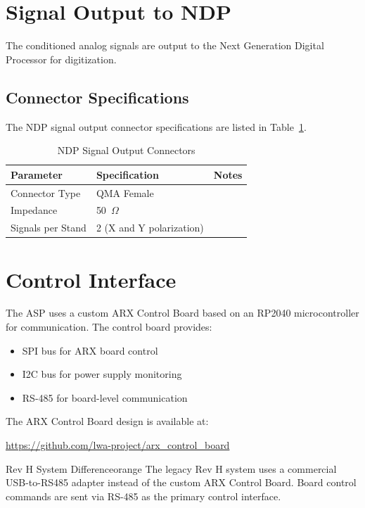 \section{Signal Output to NDP}

The conditioned analog signals are output to the Next Generation Digital Processor for digitization.

\subsection{Connector Specifications}

The NDP signal output connector specifications are listed in Table~\ref{tab:ndp-connectors}.

\begin{table}[htbp]
    \centering
    \caption{NDP Signal Output Connectors}
    \label{tab:ndp-connectors}
    \begin{tabular}{lll}
        \toprule
        \textbf{Parameter} & \textbf{Specification} & \textbf{Notes} \\
        \midrule
        Connector Type & QMA Female & \\
        Impedance & 50~$\Omega$ & \\
        Signals per Stand & 2 (X and Y polarization) & \\
        \bottomrule
    \end{tabular}
\end{table}

\section{Control Interface}

The ASP uses a custom ARX Control Board based on an RP2040 microcontroller for communication. The control board provides:
\begin{itemize}
    \item SPI bus for ARX board control
    \item I2C bus for power supply monitoring
    \item RS-485 for board-level communication
\end{itemize}

The ARX Control Board design is available at:
\begin{center}
\url{https://github.com/lwa-project/arx_control_board}
\end{center}

\begin{calloutBox}{Rev H System Difference}{orange}
The legacy Rev H system uses a commercial USB-to-RS485 adapter instead of the custom ARX Control Board. Board control commands are sent via RS-485 as the primary control interface.
\end{calloutBox}

